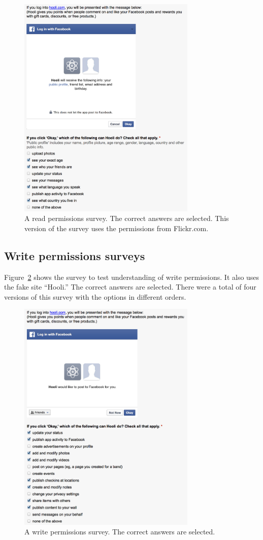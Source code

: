 \documentclass{sig-alternate}
\begin{document}
{\begin{figure}[h!]
  \centering
  \includegraphics[width=8.5cm]{64r}
  \caption{A read permissions survey. The correct answers are selected. This version of the survey uses the permissions from Flickr.com.}
  \label{figure:64r}
\end{figure}


\subsection{Write permissions surveys}
\label{appendix:writesurveys}

Figure~\ref{figure:61w} shows the survey to test understanding of write permissions. It also uses the fake site ``Hooli.'' The correct answers are selected. There were a total of four versions of this survey with the options in different orders.

\begin{figure}[h!]
  \centering
  \includegraphics[width=8.5cm]{61w}
  \caption{A write permissions survey. The correct answers are selected.}
  \label{figure:61w}
\end{figure}


}
\end{document}
